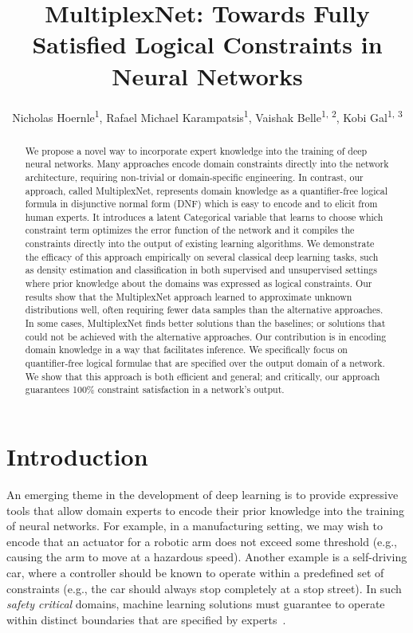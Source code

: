 \documentclass[letterpaper]{article} %
\title{MultiplexNet: Towards Fully Satisfied Logical Constraints in Neural Networks}
\author {
    Nicholas Hoernle\textsuperscript{\rm 1},
    Rafael Michael Karampatsis\textsuperscript{\rm 1},
    Vaishak Belle\textsuperscript{\rm 1, \rm 2},
    Kobi Gal\textsuperscript{\rm 1, \rm 3}
}
\begin{document}
\maketitle

\begin{abstract}
We propose a novel way to incorporate expert knowledge into the training of deep neural networks.
Many approaches encode domain constraints directly into the network architecture, requiring non-trivial or domain-specific engineering.
In contrast, our approach, called MultiplexNet, represents domain knowledge as a quantifier-free logical formula in disjunctive normal form (DNF) which is easy to encode and to elicit from human experts.
It introduces a latent Categorical variable that learns to choose which constraint term optimizes the error function of the network and it compiles the constraints directly into the output of existing learning algorithms.
We demonstrate the efficacy of this approach empirically on several classical deep learning tasks, such as density estimation and classification in both supervised and unsupervised settings where prior knowledge about the domains was expressed as logical constraints.
Our results show that the MultiplexNet approach learned to approximate unknown distributions well, often requiring fewer data samples than the alternative approaches.
In some cases, MultiplexNet finds better solutions than the baselines; or solutions that could not be achieved with the alternative approaches.
Our contribution is in encoding domain knowledge in a way that facilitates inference.
We specifically focus on quantifier-free logical formulae that are specified over the output domain of a network. We show that this approach is both efficient and general; and critically, our approach guarantees 100\% constraint satisfaction in a network's output.
\end{abstract}


\section{Introduction}
\label{sec:introduction}

An emerging theme in the development of deep learning is to provide expressive tools that allow domain experts to encode their prior knowledge into the training of neural networks.
For example, in a manufacturing setting, we may wish to encode that an actuator for a robotic arm does not exceed some threshold (e.g., causing the arm to move at a hazardous speed).
Another example is a self-driving car, where a controller should be known to operate within a predefined set of constraints (e.g., the car should always stop completely at a stop street).
In such \emph{safety critical} domains, machine learning solutions must guarantee to operate within distinct boundaries that are specified by experts~\citep{amodei2016concrete}.
\end{document}
